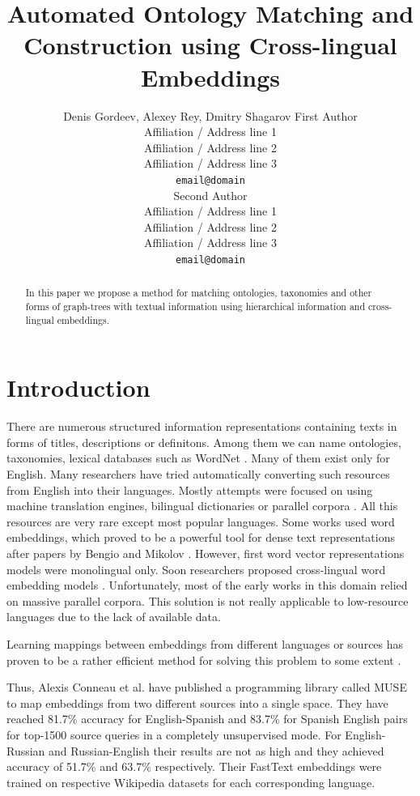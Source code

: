 \documentclass[11pt,a4paper]{article}
\title{Automated Ontology Matching and Construction using Cross-lingual Embeddings}
\author{Denis Gordeev, Alexey Rey, Dmitry Shagarov
	First Author \\
  Affiliation / Address line 1 \\
  Affiliation / Address line 2 \\
  Affiliation / Address line 3 \\
  \texttt{email@domain} \\\And
  Second Author \\
  Affiliation / Address line 1 \\
  Affiliation / Address line 2 \\
  Affiliation / Address line 3 \\
  \texttt{email@domain} \\}
\date{}
\begin{document}
\maketitle
\begin{abstract}
In this paper we propose a method for matching ontologies, taxonomies and other forms of graph-trees with textual information using hierarchical information and cross-lingual embeddings.
\end{abstract}

\section{Introduction}

There are numerous structured information representations containing texts in forms of titles, descriptions or definitons. Among them we can name ontologies, taxonomies, lexical databases such as WordNet \cite{wordnet}. Many of them exist only for English. Many researchers have tried automatically converting such resources from English into their languages. Mostly attempts were focused on using machine translation engines, bilingual dictionaries or parallel corpora \cite{Khodak2017,NEALE18.1030}. All this resources are very rare except most popular languages. Some works used word embeddings, which proved to be a powerful tool for dense text representations after papers by Bengio \cite{bengio} and Mikolov \cite{mikolov-representations-2013}. However, first word vector representations models were monolingual only. Soon researchers proposed cross-lingual word embedding models \cite{mikolov-parallel,lazaridou-parallel}. Unfortunately, most of the early works in this domain relied on massive parallel corpora. This solution is not really applicable to low-resource languages due to the lack of available data.

Learning mappings between embeddings from different languages or sources has proven to be a rather efficient method for solving this problem to some extent \cite{ruder-survey}.

Thus, Alexis Conneau et al. \cite{muse} have published a programming library called MUSE to map embeddings from two different sources into a single space. They have reached 81.7\% accuracy for English-Spanish and 83.7\% for Spanish English pairs for top-1500 source queries in a completely unsupervised mode. For English-Russian and Russian-English their results are not as high and they achieved accuracy of 51.7\% and 63.7\% respectively. Their FastText embeddings were trained on respective Wikipedia datasets for each corresponding language. 
\end{document}
